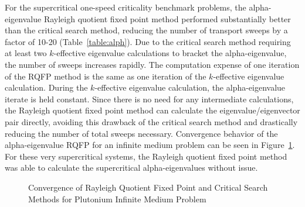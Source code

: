 \begin{table}[t]
    \centering
    \caption{Reference Eigenvalues for Infinite Medium Problems in \cite{sood2003analytical}}
\label{table:InfMed}
\end{table}

For the supercritical one-speed criticality benchmark problems, the alpha-eigenvalue Rayleigh quotient fixed point method performed substantially better than the critical search method, reducing the number of transport sweeps by a factor of 10-20 (Table~\ref{table:alph}). Due to the critical search method requiring at least two $k$-effective eigenvalue calculations to bracket the alpha-eigenvalue, the number of sweeps increases rapidly. The computation expense of one iteration of the RQFP method is the same as one iteration of the $k$-effective eigenvalue calculation. During the $k$-effective eigenvalue calculation, the alpha-eigenvalue iterate is held constant. Since there is no need for any intermediate calculations, the Rayleigh quotient fixed point method can calculate the eigenvalue/eigenvector pair directly, avoiding this drawback of the critical search method and drastically reducing the number of total sweeps necessary. Convergence behavior of the alpha-eigenvalue RQFP for an infinite medium problem can be seen in Figure~\ref{fig:AlphaInfConv}. For these very supercritical systems, the Rayleigh quotient fixed point method was able to calculate the supercritical alpha-eigenvalues without issue.

\begin{figure}[t]
	\centering
	\resizebox{!}{0.5\textheight}{
		
	}
	\caption{Convergence of Rayleigh Quotient Fixed Point and Critical Search Methods for Plutonium Infinite Medium Problem}
	\label{fig:AlphaInfConv}
\end{figure}

